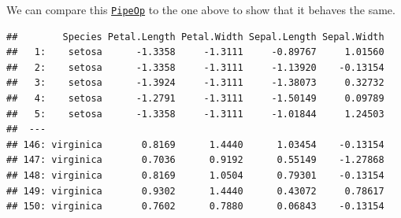 \documentclass[
]{scrbook}
\newenvironment{Shaded}{\begin{snugshade}}{\end{snugshade}}
\newcommand{\DecValTok}[1]{\textcolor[rgb]{0.00,0.00,0.81}{#1}}
\newcommand{\FunctionTok}[1]{\textcolor[rgb]{0.00,0.00,0.00}{#1}}
\newcommand{\NormalTok}[1]{#1}
\newcommand{\OtherTok}[1]{\textcolor[rgb]{0.56,0.35,0.01}{#1}}
\newcommand{\SpecialCharTok}[1]{\textcolor[rgb]{0.00,0.00,0.00}{#1}}
\renewenvironment{Shaded} {\begin{snugshade}\small} {\end{snugshade}}
\begin{document}
We can compare this \href{https://mlr3pipelines.mlr-org.com/reference/PipeOp.html}{\texttt{PipeOp}} to the one above to show that it behaves the same.

\begin{Shaded}
\end{Shaded}

\begin{Shaded}
\end{Shaded}

\begin{verbatim}
##        Species Petal.Length Petal.Width Sepal.Length Sepal.Width
##   1:    setosa      -1.3358     -1.3111     -0.89767     1.01560
##   2:    setosa      -1.3358     -1.3111     -1.13920    -0.13154
##   3:    setosa      -1.3924     -1.3111     -1.38073     0.32732
##   4:    setosa      -1.2791     -1.3111     -1.50149     0.09789
##   5:    setosa      -1.3358     -1.3111     -1.01844     1.24503
##  ---                                                            
## 146: virginica       0.8169      1.4440      1.03454    -0.13154
## 147: virginica       0.7036      0.9192      0.55149    -1.27868
## 148: virginica       0.8169      1.0504      0.79301    -0.13154
## 149: virginica       0.9302      1.4440      0.43072     0.78617
## 150: virginica       0.7602      0.7880      0.06843    -0.13154
\end{verbatim}

\begin{Shaded}
\end{Shaded}
\end{document}
